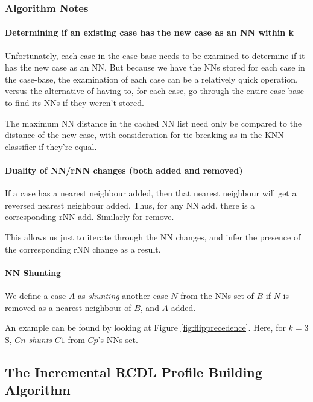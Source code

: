\documentclass[a4paper,11pt]{report}
\begin{document}
\subsubsection{Algorithm Notes}
\paragraph{Determining if an existing case has the new case as an NN within k}
Unfortunately, each case in the case-base needs to be examined to determine if it has the new case as an NN. But because we have the NNs stored for each case in the case-base, the examination of each case can be a relatively quick operation, versus the alternative of having to, for each case, go through the entire case-base to find its NNs if they weren't stored.

The maximum NN distance in the cached NN list need only be compared to the distance of the new case, with consideration for tie breaking as in the KNN classifier if they're equal.

\paragraph{Duality of NN/rNN changes (both added and removed)}
If a case has a nearest neighbour added, then that nearest neighbour will get a reversed nearest neighbour added. Thus, for any NN add, there is a corresponding rNN add. Similarly for remove.

This allows us just to iterate through the NN changes, and infer the presence of the corresponding rNN change as a result.

\paragraph{NN Shunting}
We define a case $A$ as \emph{shunting} another case $N$ from the NNs set of $B$ if $N$ is removed as a nearest neighbour of $B$, and $A$ added.

An example can be found by looking at Figure \ref{fig:flipprecedence}. Here, for $k=3$S, $Cn$ \emph{shunts} $C1$ from $Cp$'s NNs set.

\subsection{The Incremental RCDL Profile Building Algorithm}
\end{document}

